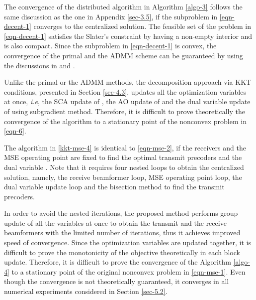 The convergence of the distributed algorithm in Algorithm \ref{algo-3} follows the same discussion as the one in Appendix \ref{sec-3.5}, if the subproblem in \eqref{eqn-decent-1} converges to the centralized solution. The feasible set of the problem in \eqref{eqn-decent-1} satisfies the Slater's constraint by having a non-empty interior and is also compact. Since the subproblem in \eqref{eqn-decent-1} is convex, the convergence of the primal and the \ac{ADMM} scheme can be guaranteed by using the discussions in \cite{bertsekas1999nonlinear,boyd2011distributed} and \cite[Prop. 4.2]{bertsekas1989parallel}.

Unlike the primal or the \ac{ADMM} methods, the decomposition approach via \ac{KKT} conditions, presented in Section \ref{sec-4.3}, updates all the optimization variables at once, \textit{i.e}, the \ac{SCA} update of , the \ac{AO} update of  and the dual variable update of \me{\alpha} using subgradient method. Therefore, it is difficult to prove theoretically the convergence of the algorithm to a stationary point of the nonconvex problem in \eqref{eqn-6}.

The algorithm in \eqref{kkt-mse-4} is identical to \eqref{eqn-mse-2}, if the receivers  and the \ac{MSE} operating point  are fixed to find the optimal transmit precoders  and the dual variable . Note that it requires four nested loops to obtain the centralized solution, namely, the receive beamformer loop, \ac{MSE} operating point loop, the dual variable update loop and the bisection method to find the transmit precoders. 

In order to avoid the nested iterations, the proposed method performs group update of all the variables at once to obtain the transmit and the receive beamformers with the limited number of iterations, thus it achieves improved speed of convergence. Since the optimization variables are updated together, it is difficult to prove the monotonicity of the objective theoretically in each block update. Therefore, it is difficult to prove the convergence of the Algorithm \ref{algo-4} to a stationary point of the original nonconvex problem in \eqref{eqn-mse-1}. Even though the convergence is not theoretically guaranteed, it converges in all numerical experiments considered in Section \ref{sec-5.2}.

